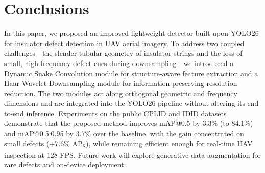 \documentclass[sensors,article,submit,pdftex,moreauthors]{Definitions/mdpi}
\begin{document}
\section{Conclusions}\label{sec:conclusions}

In this paper, we proposed an improved lightweight detector built upon YOLO26 for insulator defect detection in UAV aerial imagery. To address two coupled challenges---the slender tubular geometry of insulator strings and the loss of small, high-frequency defect cues during downsampling---we introduced a Dynamic Snake Convolution module for structure-aware feature extraction and a Haar Wavelet Downsampling module for information-preserving resolution reduction. The two modules act along orthogonal geometric and frequency dimensions and are integrated into the YOLO26 pipeline without altering its end-to-end inference. Experiments on the public CPLID and IDID datasets demonstrate that the proposed method improves mAP@0.5 by 3.3\% (to 84.1\%) and mAP@0.5:0.95 by 3.7\% over the baseline, with the gain concentrated on small defects (+7.6\% AP\textsubscript{S}), while remaining efficient enough for real-time UAV inspection at 128 FPS. Future work will explore generative data augmentation for rare defects and on-device deployment.

\vspace{6pt}









\end{document}
